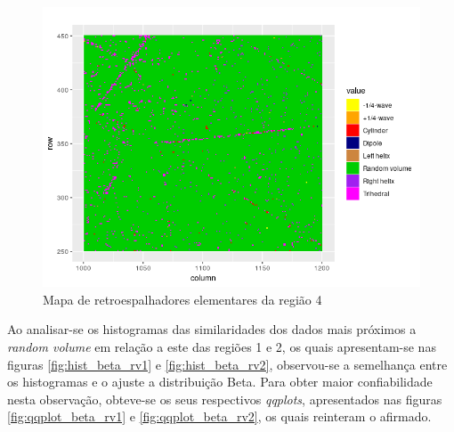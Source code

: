 \documentclass[12pt]{article}
\begin{document}
\begin{figure}[!h]

  \centering
  \includegraphics[width=\linewidth]{../../Images/Report_19_02_27/scatterer_map_region4.png}
  \caption{Mapa de retroespalhadores elementares da região 4}
  \label{fig:scatterer_map4}

\end{figure}

\newpage

Ao analisar-se os histogramas das similaridades dos dados mais próximos a \textit{random volume} em relação a este das regiões 1 e 2, os quais apresentam-se nas figuras \ref{fig:hist_beta_rv1} e \ref{fig:hist_beta_rv2}, observou-se a semelhança entre os histogramas e o ajuste a distribuição Beta. Para obter maior confiabilidade nesta observação, obteve-se os seus respectivos \textit{qqplots}, apresentados nas figuras \ref{fig:qqplot_beta_rv1} e \ref{fig:qqplot_beta_rv2}, os quais reinteram o afirmado.

\end{document}
